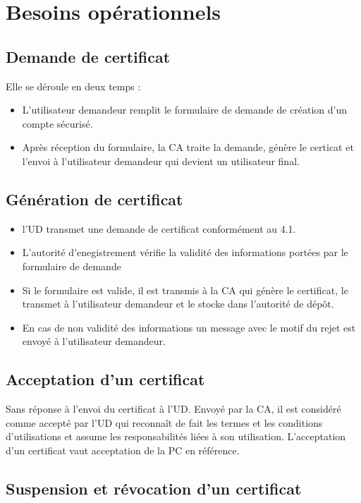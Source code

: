 \documentclass[a4paper,11pt,french]{book}
\begin{document}
\section{Besoins opérationnels}

\subsection{Demande de certificat}

Elle se déroule en deux temps :
\begin{itemize}
\item L'utilisateur demandeur remplit le formulaire de demande de création d'un compte sécurisé.
\item Après réception du formulaire, la CA traite la demande, génère le certicat et l'envoi à l'utilisateur demandeur qui devient un utilisateur final.
 \end{itemize}
 
\subsection{Génération de certificat}
\begin{itemize}
\item l'UD transmet une demande de certificat conformément au 4.1. \item L'autorité d'enegistrement vérifie la validité des informations portées par le formulaire de demande
\item Si le formulaire est valide, il est transmis à la CA qui génère le certificat, le transmet à l'utilisateur demandeur et le stocke dans l'autorité de dépôt.
\item En cas de non validité des informations un message avec le motif du rejet est envoyé à l'utilisateur demandeur.

\end{itemize}

\subsection{Acceptation d'un certificat}
Sans réponse à l'envoi du certificat à l'UD. Envoyé par la CA, il est considéré comme accepté par l'UD qui reconnaît de fait les termes et les conditions d'utilisations et assume les responsabilités liées à son utilisation. L'acceptation d'un certificat vaut acceptation de la PC en référence.

\subsection{Suspension et révocation d'un certificat}
\end{document}
